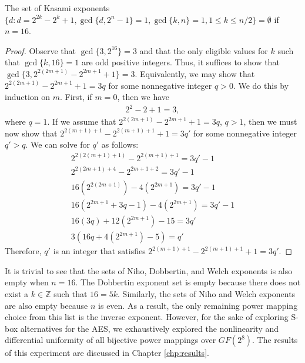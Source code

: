 \begin{thm}
The set of Kasami exponents $\{d : d = 2^{2k} - 2^k + 1, \gcd\{d, 2^n - 1\} = 1, \gcd\{k, n\} = 1, 1 \leq k \leq n/2\} = \emptyset$ if $n = 16$.
\end{thm}
\begin{proof}
Observe that $\gcd\{3, 2^{16}\} = 3$ and that the only eligible values for $k$ such that $\gcd\{k, 16\} = 1$ are odd positive integers. Thus, it suffices to show that $\gcd\{3, 2^{2(2m + 1)} - 2^{2m + 1} + 1\} = 3$. Equivalently, we may show that $2^{2(2m + 1)} - 2^{2m + 1} + 1 = 3q$ for some nonnegative integer $q > 0$. We do this by induction on $m$. First, if $m = 0$, then we have
\begin{align*}
2^{2} - 2 + 1 = 3,
\end{align*}
where $q = 1$. If we assume that $2^{2(2m + 1)} - 2^{2m + 1} + 1 = 3q$, $q > 1$, then we must now show that $2^{2(m+1) + 1} - 2^{2(m+1) + 1} + 1 = 3q'$ for some nonnegative integer $q' > q$. We can solve for $q'$ as follows:
\begin{align*}
2^{2(2(m + 1) + 1)} - 2^{2(m + 1) + 1} = 3q' - 1 \\
2^{2(2m + 1) + 4} - 2^{2m + 1 + 2} = 3q' - 1 \\
16(2^{2(2m + 1)}) - 4(2^{2m + 1}) = 3q' - 1 \\
16(2^{2m + 1} + 3q - 1) - 4(2^{2m + 1}) = 3q' - 1 \\
16(3q) + 12(2^{2m + 1}) - 15 = 3q' \\
3(16q + 4(2^{2m + 1}) - 5) = q'
\end{align*}
Therefore, $q'$ is an integer that satisfies $2^{2(m+1) + 1} - 2^{2(m+1) + 1} + 1 = 3q'$.
\end{proof}

It is trivial to see that the sets of Niho, Dobbertin, and Welch exponents is also empty when $n = 16$. The Dobbertin exponent set is empty because there does not exist a $k \in \mathbb{Z}$ such that $16 = 5k$. Similarly, the sets of Niho and Welch exponents are also empty because $n$ is even. As a result, the only remaining power mapping choice from this list is the inverse exponent. However, for the sake of exploring S-box alternatives for the AES, we exhaustively explored the nonlinearity and differential uniformity of all bijective power mappings over $GF(2^8)$. The results of this experiment are discussed in Chapter \ref{chp:results}.

